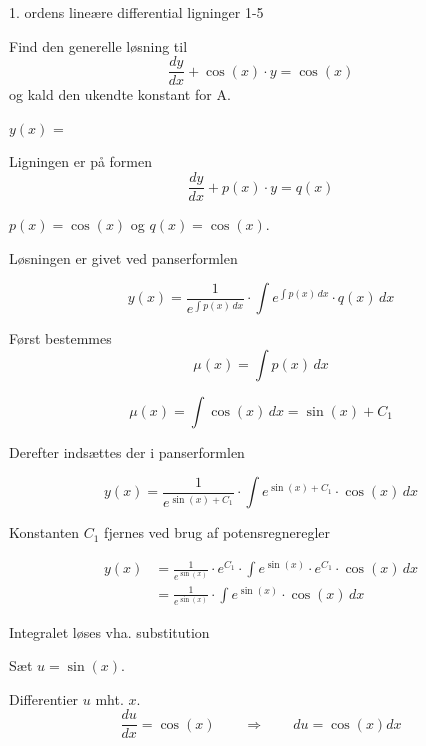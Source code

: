 \documentclass{article}
\begin{document}
\begin{exercise}{1. ordens lineære differential ligninger 1-5}
	
	
	
	
	
	Find den generelle løsning til
	\[
	\frac{dy}{dx} + \cos(x) \cdot y = \cos(x)
	\]
	og kald den ukendte konstant for A.
	
	$y(x)$ =  \\
	
	
	
	\hint
	
	Ligningen er på formen
	\[
	\frac{dy}{dx} + p(x) \cdot y = q(x)
	\]
	
	\hint
	
	$p(x)=\cos(x)$ og $q(x)=\cos(x)$.
	
	\hint
	
	Løsningen er givet ved panserformlen
	
	
	\hint
	
	\[
	y(x) = \frac{1}{e^{\int p(x) \, dx}} \cdot \int e^{\int p(x) \, dx}  \cdot q(x) \, dx
	\]
	
	\hint
	
	Først bestemmes 
	\[
	\mu(x) = \int p(x) \, dx
	\]
	
	\hint
	\[
	\mu(x) = \int \cos(x) \, dx = \sin(x) + C_1
	\]
	
	\hint
	Derefter indsættes der i  panserformlen
	
	\hint
	
	\[
	y(x) = \frac{1}{e^{\sin(x) + C_1}} \cdot \int e^{\sin(x) + C_1}  \cdot \cos(x) \, dx
	\]
	
	
	\hint
	
	Konstanten $C_1$ fjernes ved brug af potensregneregler
	
	\hint
	\begin{align*}
	y(x) &= \frac{1}{e^{\sin(x)}} \cdot e^{C_1} \cdot \int e^{\sin(x)} \cdot e^{C_1}  \cdot \cos(x) \, dx  \\
	&= \frac{1}{e^{\sin(x)}} \cdot \int e^{\sin(x)}  \cdot \cos(x) \, dx
	\end{align*}
	
	\hint
	
	Integralet løses vha. substitution
	
	
	\hint
	Sæt $u = \sin(x)$.
	
	\hint
	
	Differentier $u$ mht. $x$.
	\[
	\frac{du}{dx} = \cos(x) \qquad	\Rightarrow \qquad du = \cos(x) dx
	\]
	

\end{exercise}
\end{document}
